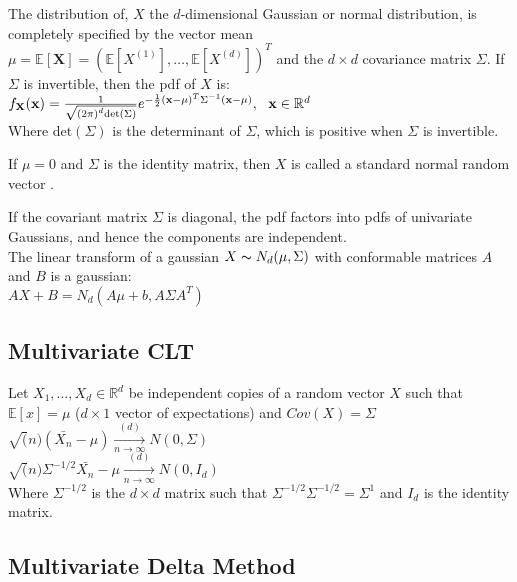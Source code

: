 The distribution of, $X$ the $d$-dimensional Gaussian or normal distribution, is completely specified by the vector mean $\mu =\mathbb E[\mathbf{X}]= (\mathbb E[X^{(1)}],\ldots ,\mathbb E[X^{(d)}])^ T$ and the $d \times d$ covariance matrix $\Sigma$. If $\Sigma$ is invertible, then the pdf of $X$ is:\\

$   f_{\mathbf X}(\mathbf x) = \frac{1}{\sqrt{\left(2\pi \right)^ d \text {det}(\Sigma )}}e^{-\frac{1}{2}(\mathbf x-\mu )^ T \Sigma ^{-1} (\mathbf x-\mu )}, ~ ~ ~ \\ \mathbf x\in \mathbb {R}^ d$\\


Where $\text {det}(\Sigma )$ is the determinant of $\Sigma$, which is positive when $\Sigma$ is invertible.

If $\mu = 0$ and $\Sigma$ is the identity matrix, then $X$ is called a standard normal random vector .

If the covariant matrix $\Sigma$ is diagonal, the pdf factors into pdfs of univariate Gaussians, and hence the components are independent.\\

The linear transform of a gaussian $X \thicksim N_d(\mu,\Sigma)$ with conformable matrices $A$ and $B$ is a gaussian:\\ 

$AX + B = N_d(A\mu + b, A \Sigma A^T)$

\subsection*{Multivariate CLT}

Let $X_1, \ldots, X_d \in \mathbb{R}^d$ be independent copies of a random vector $X$
such that $\mathbb{E}[x] = \mu$ ($d \times 1$ vector of expectations) and $Cov(X)= \Sigma$\\

$\sqrt(n)(\bar{X_n}-\mu) \xrightarrow[n \rightarrow \infty]{(d)} N(0,\Sigma)$\\

$\sqrt(n) \Sigma^{-1/2} \bar{X_n}-\mu \xrightarrow[n \rightarrow \infty]{(d)} N(0,I_d)$\\

Where $\Sigma^{-1/2}$ is the $d \times d$ matrix such that $\Sigma^{-1/2} \Sigma^{-1/2} = \Sigma^{1}$ and $I_d$ is the identity matrix.\\

\subsection*{Multivariate Delta Method}

